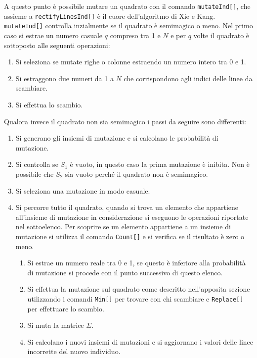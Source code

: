 \documentclass[italian,twoside,twocolumn]{article}
\begin{document}
A questo punto è possibile mutare un quadrato con il comando \texttt{mutateInd[]}, che assieme a \texttt{rectifyLinesInd[]} è il cuore dell'algoritmo di Xie e Kang. \texttt{mutateInd[]} controlla inzialmente se il quadrato è semimagico o meno. Nel primo caso si estrae un numero casuale $ q $ compreso tra 1 e $ N $ e per $ q $ volte il quadrato è sottoposto alle seguenti operazioni:
\begin{enumerate}
	\item Si seleziona se mutate righe o colonne estraendo un numero intero tra 0 e 1.
	\item Si estraggono due numeri da 1 a $ N $ che corrispondono agli indici delle linee da scambiare.
	\item Si effettua lo scambio.
\end{enumerate}
Qualora invece il quadrato non sia semimagico i passi da seguire sono differenti:
\begin{enumerate}
	\item Si generano gli insiemi di mutazione e si calcolano le probabilità di mutazione.
	\item Si controlla se $ S_1 $ è vuoto, in questo caso la prima mutazione è inibita. Non è possibile che $ S_2 $ sia vuoto perché il quadrato non è semimagico.
	\item Si seleziona una mutazione in modo casuale.
	\item Si percorre tutto il quadrato, quando si trova un elemento che appartiene all'insieme di mutazione in considerazione si eseguono le operazioni riportate nel sottoelenco. Per scoprire se un elemento appartiene a un insieme di mutazione si utilizza il comando \texttt{Count[]} e si verifica se il risultato è zero o meno.
	\begin{enumerate}
		\item Si estrae un numero reale tra 0 e 1, se questo è inferiore alla probabilità di mutazione si procede con il punto successivo di questo elenco.
		\item Si effettua la mutazione sul quadrato come descritto nell'apposita sezione utilizzando i comandi \texttt{Min[]} per trovare con chi scambiare e \texttt{Replace[]} per effettuare lo scambio.
		\item Si muta la matrice $ \Sigma $.
		\item Si calcolano i nuovi insiemi di mutazioni e si aggiornano i valori delle linee incorrette del nuovo individuo.
	\end{enumerate}
\end{enumerate}
\end{document}
